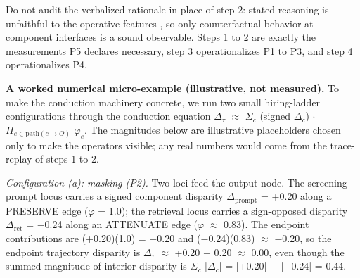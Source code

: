 \documentclass[acmsmall,nonacm]{acmart}
\begin{document}
Do not audit the verbalized rationale in place of step 2: stated reasoning is unfaithful to the operative features \cite{turpin2023language}, so only counterfactual behavior at component interfaces is a sound observable. Steps 1 to 2 are exactly the measurements P5 declares necessary, step 3 operationalizes P1 to P3, and step 4 operationalizes P4.

\textbf{A worked numerical micro-example (illustrative, not measured).} To make the conduction machinery concrete, we run two small hiring-ladder configurations through the conduction equation $\Delta_\tau$ $\approx$ $\Sigma_c$ (signed $\Delta_c$) $\cdot$ $\Pi_{e \in \mathrm{path}(c \rightarrow O)}$ $\varphi_e$. The magnitudes below are illustrative placeholders chosen only to make the operators visible; any real numbers would come from the trace-replay of steps 1 to 2.

\emph{Configuration (a): masking (P2).} Two loci feed the output node. The screening-prompt locus carries a signed component disparity $\Delta_{\mathrm{prompt}}$ = +0.20 along a PRESERVE edge ($\varphi$ = 1.0); the retrieval locus carries a sign-opposed disparity $\Delta_{\mathrm{ret}}$ = $-$0.24 along an ATTENUATE edge ($\varphi$ $\approx$ 0.83). The endpoint contributions are (+0.20)(1.0) = +0.20 and ($-$0.24)(0.83) $\approx$ $-$0.20, so the endpoint trajectory disparity is $\Delta_\tau$ $\approx$ +0.20 $-$ 0.20 $\approx$ 0.00, even though the summed magnitude of interior disparity is $\Sigma_c$ |$\Delta_c$| = |+0.20| + |$-$0.24| = 0.44.

\begin{table}[htbp]
\centering\small
\caption{Worked micro-example, configuration (a) (masking, P2): two sign-opposed loci yield an endpoint $\Delta_\tau \approx 0$ that hides a large summed interior disparity (illustrative values).}
\label{tab:example-masking}
\end{table}
\end{document}
